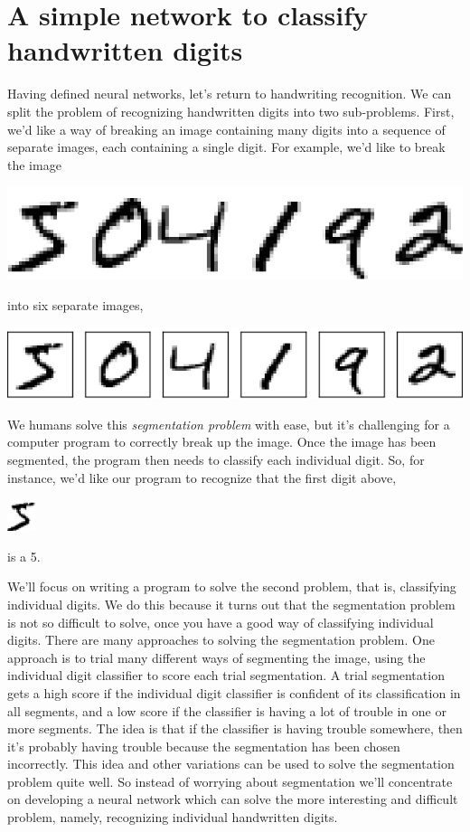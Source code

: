 \documentclass[a4paper,twoside,10pt]{book}
\begin{document}
\section{A simple network to classify handwritten digits}
Having defined neural networks, let's return to handwriting recognition. We can split the problem of recognizing handwritten digits into two sub-problems. First, we'd like a way of breaking an image containing many digits into a sequence of separate images, each containing a single digit. For example, we'd like to break the image
\begin{center}
	\includegraphics[scale=0.25]{./figures/ch1/digits}
\end{center}
into six separate images,
\begin{center}
	\includegraphics[scale=0.4]{./figures/ch1/digits_separate}
\end{center}
We humans solve this \textit{segmentation problem} with ease, but it's challenging for a computer program to correctly break up the image. Once the image has been segmented, the program then needs to classify each individual digit. So, for instance, we'd like our program to recognize that the first digit above,
\begin{center}
	\includegraphics[scale=0.65]{./figures/ch1/mnist_first_digit}
\end{center}
is a 5.

We'll focus on writing a program to solve the second problem, that is, classifying individual digits. We do this because it turns out that the segmentation problem is not so difficult to solve, once you have a good way of classifying individual digits. There are many approaches to solving the segmentation problem. One approach is to trial many different ways of segmenting the image, using the individual digit classifier to score each trial segmentation. A trial segmentation gets a high score if the individual digit classifier is confident of its classification in all segments, and a low score if the classifier is having a lot of trouble in one or more segments. The idea is that if the classifier is having trouble somewhere, then it's probably having trouble because the segmentation has been chosen incorrectly. This idea and other variations can be used to solve the segmentation problem quite well. So instead of worrying about segmentation we'll concentrate on developing a neural network which can solve the more interesting and difficult problem, namely, recognizing individual handwritten digits.
\end{document}
